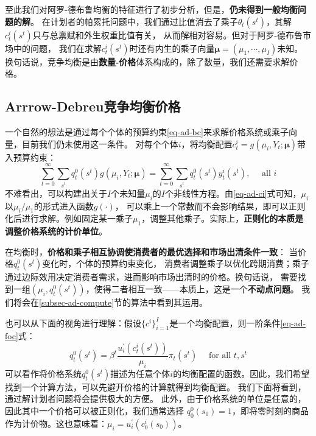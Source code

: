 至此我们对阿罗-德布鲁均衡的特征进行了初步分析，但是，\textbf{仍未得到一般均衡问题的解}。
在计划者的帕累托问题中，我们通过比值消去了乘子$\theta_t\left(s^t\right)$，其解$c_t^i\left(s^t\right)$只与总禀赋和外生权重比值有关，
从而解相对容易。但对于阿罗-德布鲁市场中的问题，
我们在求解$c_t^i\left(s^t\right)$时还有内生的乘子向量$\boldsymbol{\mu}=(\mu_1,\cdots,\mu_I)$未知。
换句话说，竞争均衡是由\textbf{数量-价格}体系构成的，除了数量，我们还需要求解价格。


\subsection{Arrrow-Debreu竞争均衡价格}    \label{subsec-ad-price}

一个自然的想法是通过每个个体的预算约束\ref{eq-ad-bc}来求解价格系统或乘子向量，目前我们仍未使用这一条件。
对每个个体$i$，将均衡配置$c_t^i=g\left(\mu_i, Y_t ; \boldsymbol{\mu}\right)$带入预算约束：
\begin{equation*}
    \sum_{t=0}^{\infty} \sum_{s^t} q_t^0\left(s^t\right) g\left(\mu_i, Y_t ; \boldsymbol{\mu}\right)
        =\sum_{t=0}^{\infty} \sum_{s^t} q_t^0\left(s^t\right) y_t^i\left(s^t\right), \quad \text { all } i
\end{equation*}
不难看出，可以构建出关于$I$个未知量$\mu_i$的$I$个非线性方程。由\ref{eq-ad-ci}式可知，$\mu_i$以$\mu_i/\mu_1$的形式进入函数$g(\cdot)$，
可以乘上一个常数而不会影响结果，即可以正则化后进行求解。例如固定某一乘子$\mu_1$，调整其他乘子。实际上，\textbf{正则化的本质是调整价格系统的计价单位}。

在均衡时，\textbf{价格和乘子相互协调使消费者的最优选择和市场出清条件一致}：
当价格$q_t^0\left(s^t\right)$变化时，个体的预算约束变化，
消费者调整乘子以优化跨期消费；乘子通过边际效用决定消费者需求，进而影响市场出清时的价格。换句话说，
需要找到一组$\left(\mu_i, q_t^0\left(s^t\right)\right)$，使得二者相互一致——本质上，这是一个\textbf{不动点问题}。
我们将会在\ref{subsec-ad-compute}节的算法中看到其运用。

也可以从下面的视角进行理解：假设$\{c^i\}_{i=1}^{I}$是一个均衡配置，则一阶条件\ref{eq-ad-foc}式：
\begin{equation*} 
    q_t^0\left(s^t\right) = \beta^t \frac{u_i^{\prime}\left(c_t^i\left(s^t\right)\right)}{\mu_i} \pi_t\left(s^t\right)
    \quad \text { for all } t, s^t
\end{equation*}
可以看作将价格系统$q_t^0\left(s^t\right)$描述为任意个体$i$的均衡配置的函数。因此，我们希望找到一个计算方法，可以先避开价格的计算就得到均衡配置。
我们下面将看到，通过解计划者问题将会提供极大的方便。
此外，由于价格系统的单位是任意的，因此其中一个价格可以被正则化，我们通常选择
$q_0^0\left(s_0\right)=1$，即将零时刻的商品作为计价物。这也意味着：$\mu_i = u_i^{\prime}\left(c_0^i\left(s_0\right)\right)$。


